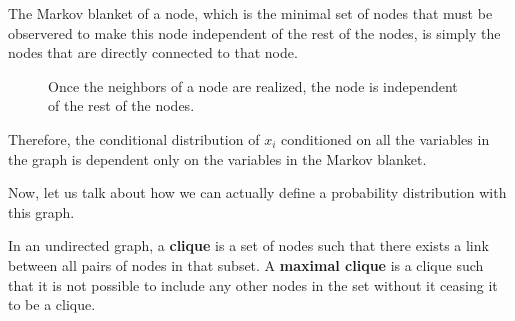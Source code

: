 \documentclass{article}
\begin{document}
  \begin{definition}
    \label{def:markov-blanket-in-undirected-graphs}
    The Markov blanket of a node, which is the minimal set of nodes that must be observered to make this node independent of the rest of the nodes, is simply the nodes that are directly connected to that node. 

    \begin{figure}[H]
      \centering 
      \caption{Once the neighbors of a node are realized, the node is independent of the rest of the nodes. } 
      \label{fig:markov_blanket_undirected}
    \end{figure}

    Therefore, the conditional distribution of $x_i$ conditioned on all the variables in the graph is dependent only on the variables in the Markov blanket. 
  \end{definition}

  Now, let us talk about how we can actually define a probability distribution with this graph. 

  \begin{definition}[Clique]
    \label{def:clique}
 
    In an undirected graph, a \textbf{clique} is a set of nodes such that there exists a link between all pairs of nodes in that subset. A \textbf{maximal clique} is a clique such that it is not possible to include any other nodes in the set without it ceasing it to be a clique. 
  \end{definition}
\end{document}
